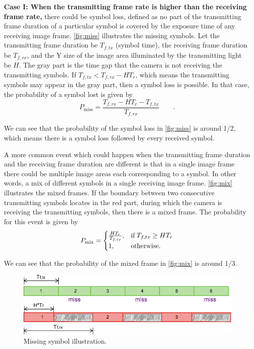 \textbf{Case I: When the transmitting frame rate is higher than the receiving frame rate,}
there could be symbol loss, defined as no part of the transmitting frame duration of a particular symbol is covered by the exposure time of any receiving image frame. 
\autoref{fig:miss} illustrates the missing symbols. 
Let the transmitting frame duration be $T_{f,tx}$ (symbol time), the receiving frame duration be $T_{f,rx}$, and the Y size of the image area illuminated by the transmitting light be $H$. The gray part is the time gap that the camera is not receiving the transmitting symbols. If $T_{f,tx} < T_{f,rx} - H T_r$, which means the transmitting symbols may appear in the gray part, then a symbol loss is possible. In that case, the probability of a symbol lost is given by
\begin{equation}
	P_{\operatorname{miss}}=\frac{T_{f,rx} - H T_r - T_{f,tx} }{T_{f,rx}} \qquad \textrm{.}
\end{equation}

We can see that the probability of the symbol loss in \autoref{fig:miss} is around 1/2, which means there is a symbol loss followed by every received symbol. 


A more common event which could happen when the transmitting frame duration and the receiving frame duration are different is that in a single image frame there could be multiple image areas each corresponding to a symbol. In other words, a mix of different symbols in a single receiving image frame. 
\autoref{fig:mix} illustrates the mixed frames. If the boundary between two consecutive transmitting symbols locates in the red part, during which the camera is receiving the transmitting symbols, then there is a mixed frame.
The probability for this event is given by
\begin{equation}
P_{\operatorname{mix}}=\begin{cases} \frac{H T_r}{T_{f,tx}}, & \textrm{if\;} T_{f,tx} \geq H T_r \\
1, & \textrm{otherwise.} \end{cases}
\end{equation}

We can see that the probability of the mixed frame in \autoref{fig:mix} is around 1/3. 

\begin{figure}[!t]
  \centering
  \includegraphics[scale=0.35]{fig/miss.png}
  \caption{Missing symbol illustration.}
  \label{fig:miss}
\end{figure}

